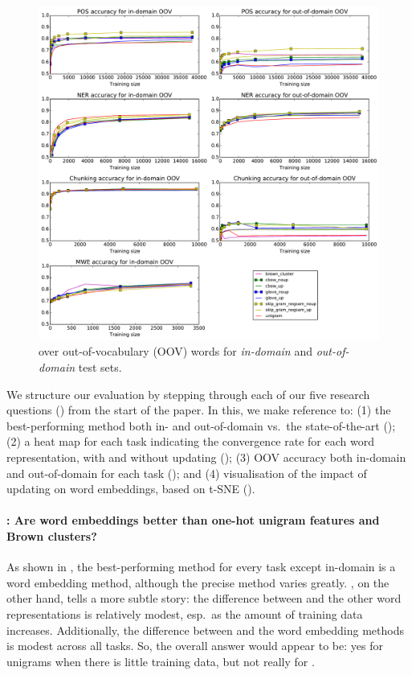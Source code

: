 \begin{figure}[t!]
\centering
    	\includegraphics[scale=0.5]{plots/OOV-plots}
\caption{\accuracy over out-of-vocabulary (OOV) words for \textit{in-domain} and \textit{out-of-domain} test sets.}
\label{OOV} 
\end{figure}



We structure our evaluation by stepping through each of our five
research questions (\RQ[1--5]) from the start of the paper. In this, we
make reference to: (1) the best-performing method both in- and
out-of-domain vs.\ the state-of-the-art (); (2) a
heat map for each task indicating the convergence rate for each word
representation, with and without updating (); 
(3) OOV accuracy both in-domain and out-of-domain for each task
(); and (4)  visualisation of the impact of
updating on word embeddings, based on t-SNE
().

\paragraph{\RQ[1]: Are word embeddings better than one-hot unigram features
  and Brown clusters?}  As shown in , the
best-performing method for every task except in-domain \chunking is a
word embedding method, although the precise method varies
greatly. , on the other hand, tells a more subtle
story: the difference between \unigram and the other word
representations is relatively modest, esp.\ as the amount of training
data increases. Additionally, the difference between \brown and the word
embedding methods is modest across all tasks. So, the overall answer
would appear to be: yes for unigrams when there is little training data, but not really for \brown.




